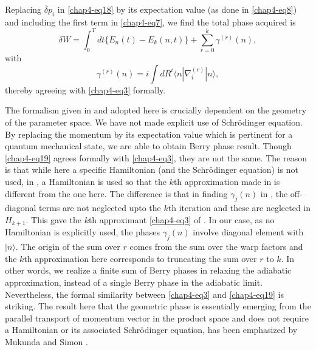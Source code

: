 Replacing $\bar{\delta}p_i$ in \eqref{chap4-eq18} by its expectation value (as done in \eqref{chap4-eq8}) and including the first term in \eqref{chap4-eq7}, we  find the total phase acquired is 
\begin{equation}
\delta W=  \int_0^T dt\{E_n(t)-E_k(n,t)\} +\sum_{r=0}^k{\gamma}^{(r)}(n), \label{chap4-eq19}
\end{equation}
with
\begin{equation}
{\gamma}^{(r)}(n)= i\int dR^i\langle n|{\nabla}^{(r)}_i|n\rangle,\label{chap4-eq20}
\end{equation}
thereby agreeing with \eqref{chap4-eq3} formally.    

The formalism given in \cite{key6, key7} and adopted here is crucially dependent on the geometry of the parameter space. We have  not made explicit use of Schr\"{o}dinger equation. By replacing the momentum by its expectation value which is pertinent  for a quantum mechanical state, we are able to obtain Berry phase result. Though \eqref{chap4-eq19} agrees formally with \eqref{chap4-eq3}, they are  not the same. The reason is that while here a specific Hamiltonian (and the Schr\"{o}dinger equation) is not used, in \cite{key5}, a  Hamiltonian is used so that the $k$th approximation made in \cite{key5} is different from the one here. The difference is that in  finding ${\gamma}_j(n)$ in \cite{key5}, the off-diagonal terms are not neglected upto the $k$th iteration and these are  neglected in $H_{k+1}$. This gave the $k$th approximant \eqref{chap4-eq3} of \cite{key5}. In our case, as no Hamiltonian is explicitly used,  the phases ${\gamma}_j(n)$ involve diagonal element with $|n\rangle$. The origin of the sum over $r$ comes from the  sum over the warp factors and the $k$th approximation here corresponds to truncating the sum over $r$ to $k$. In other  words, we realize a finite sum of Berry phases in relaxing the adiabatic approximation, instead of a single Berry  phase in the adiabatic limit.   Nevertheless, the formal similarity between \eqref{chap4-eq3} and \eqref{chap4-eq19} is striking. The result here  that the geometric phase is essentially emerging from the parallel transport of momentum vector in the product space  and does not require a Hamiltonian or its associated Schr\"{o}dinger equation, has been emphasized by Mukunda and  Simon \cite{key8}.   

\vspace{0.5cm}
{}
\vspace{0.5cm}

